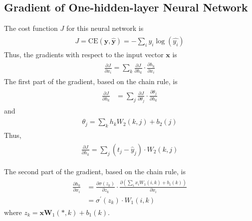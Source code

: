 \documentclass[paper=a4, fontsize=11pt]{scrartcl} %
\numberwithin{equation}{section} %
\numberwithin{figure}{section} %
\numberwithin{table}{section} %
\begin{document}
\subsection{Gradient of One-hidden-layer Neural Network}
The cost function $J$ for this neural network is 
\begin{align} 
\begin{split}
	J = \mbox{CE}(\textbf{y}, \hat{\textbf{y}}) = - \sum_{i} y_{i} \log( \hat{y_{i}}) 
\end{split}					
\end{align}
Thus, the gradients with respect to the input vector $\textbf{x}$ is 
\begin{align} 
\begin{split}
	\frac{\partial J}{\partial x_{i}} = \sum_{k} \frac{\partial J}{\partial h_{k}} \cdot \frac{\partial h_{k}}{\partial x_{i}}
\end{split}					
\end{align}
The first part of the gradient, based on the chain rule, is 
\begin{align} 
\begin{split}
	\frac{\partial J}{\partial h_{k}} & = \sum_{j} \frac{\partial J}{\partial \theta_{j}} \cdot \frac{\partial \theta_{j}}{\partial h_{k}}
\end{split}					
\end{align}
and 
\begin{align} 
\begin{split}
	\theta_{j} = \sum_{k} h_{k} W_{2}(k,j) + b_{2}(j)
\end{split}					
\end{align}
Thus,
\begin{align} 
\begin{split}
	\frac{\partial J}{\partial h_{k}} = \sum_{j} (t_{j} - \hat{y}_{j}) \cdot W_{2}(k,j)
\end{split}					
\end{align}


The second part of the gradient, based on the chain rule, is
\begin{align} 
\begin{split}
 \frac{\partial h_{k}}{\partial x_{i}} &= \frac{\partial \sigma(z_{k})}{\partial z_{k}} \cdot \frac{ \partial (\sum_{i} x_{i} W_{1}(i,k) + b_{1}(k))}{\partial x_{i}} \\
  &= \sigma^{\prime}(z_{k}) \cdot W_{1}(i,k) 
\end{split}					
\end{align}
where $z_{k} = \textbf{x}\textbf{W}_{1}(*,k)+ b_{1}(k)$.
\end{document}
